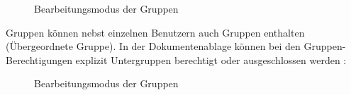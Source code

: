 \begin{figure}[H]
\caption{Bearbeitungsmodus der Gruppen}
\end{figure}

Gruppen können nebst einzelnen Benutzern auch Gruppen enthalten (Übergeordnete Gruppe). In der Dokumentenablage können bei den Gruppen-Berechtigungen explizit Untergruppen berechtigt oder ausgeschlossen werden :

\begin{figure}[H]
\caption{Bearbeitungsmodus der Gruppen}
\end{figure}
